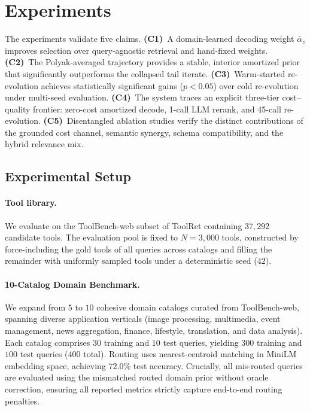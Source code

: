 \section{Experiments}
\label{sec:exp}

The experiments validate five claims. \textbf{(C1)}~A domain-learned decoding weight $\bar\alpha_z$ improves selection over query-agnostic retrieval and hand-fixed weights. \textbf{(C2)}~The Polyak-averaged trajectory provides a stable, interior amortized prior that significantly outperforms the collapsed tail iterate. \textbf{(C3)}~Warm-started re-evolution achieves statistically significant gains ($p < 0.05$) over cold re-evolution under multi-seed evaluation. \textbf{(C4)}~The system traces an explicit three-tier cost--quality frontier: zero-cost amortized decode, 1-call LLM rerank, and 45-call re-evolution. \textbf{(C5)}~Disentangled ablation studies verify the distinct contributions of the grounded cost channel, semantic synergy, schema compatibility, and the hybrid relevance mix.

\subsection{Experimental Setup}
\label{sec:exp_setup}

\paragraph{Tool library.}
We evaluate on the ToolBench-web subset of ToolRet containing $37{,}292$ candidate tools. The evaluation pool is fixed to $N{=}3{,}000$ tools, constructed by force-including the gold tools of all queries across catalogs and filling the remainder with uniformly sampled tools under a deterministic seed ($42$).

\paragraph{10-Catalog Domain Benchmark.}
We expand from $5$ to $10$ cohesive domain catalogs curated from ToolBench-web, spanning diverse application verticals (image processing, multimedia, event management, news aggregation, finance, lifestyle, translation, and data analysis). Each catalog comprises $30$ training and $10$ test queries, yielding $300$ training and $100$ test queries ($400$ total). Routing uses nearest-centroid matching in MiniLM embedding space, achieving $72.0\%$ test accuracy. Crucially, all mis-routed queries are evaluated using the mismatched routed domain prior without oracle correction, ensuring all reported metrics strictly capture end-to-end routing penalties.

